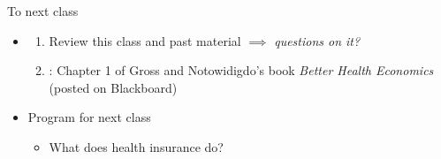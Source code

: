 \begin{frame}{To next class}
\begin{itemize}
    \item {}
    \begin{enumerate}
        \item Review this class and past material $\implies$ \textit{questions on it?}
        \item {}: Chapter 1 of Gross and Notowidigdo's book \textit{Better Health Economics} (posted on Blackboard)
    \end{enumerate}
    \vspace{5mm}

    \item Program for next class
    \begin{itemize}
        \item What does health insurance do?
    \end{itemize}
\end{itemize}
\end{frame}
